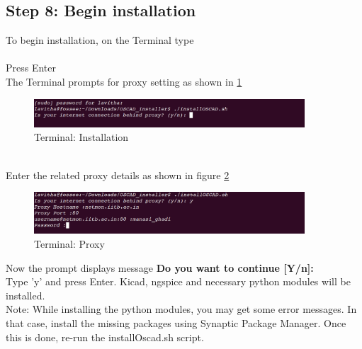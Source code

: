 \subsection {Step 8: Begin installation }
To begin installation, on the Terminal type\\
\\
Press Enter\\
The Terminal prompts for proxy setting as shown in \ref{proxy}
\begin{figure}[h!]
\centering
\includegraphics[width=0.9\textwidth]{figures/install4.png}
\caption{Terminal: Installation}
\label{proxy}
\end{figure}\\
Enter the related proxy details as shown in figure \ref{proxys}
\begin{figure}[h]
\centering
\includegraphics[width=0.9\textwidth]{figures/install5.png}
\caption{Terminal: Proxy}
\label{proxys}
\end{figure}
\newline
Now the prompt displays message 
\textbf{Do you want to continue [Y/n]:}\\
Type 'y' and press Enter. Kicad, ngspice and necessary python modules will be installed.\\
Note: While installing the python modules, you may get some error messages.
In that case, install the missing packages using Synaptic Package Manager. 
Once this is done, re-run the installOscad.sh script.
